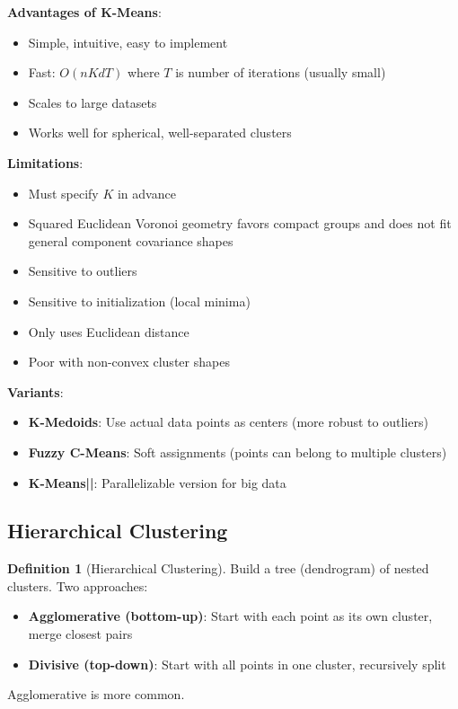 \documentclass[11pt,twoside]{article}
\numberwithin{equation}{section}
\theoremstyle{plain}
\theoremstyle{definition}
\newtheorem{definition}[theorem]{Definition}
\theoremstyle{remark}
\newenvironment{keyidea}{
  \begin{tcolorbox}[colback=yellow!5!white,
                    colframe=yellow!50!black,
                    title=Key Idea,
                    breakable,
                    enhanced,
                    sharp corners,
                    boxrule=0.8pt,
                    left=6pt, right=6pt, top=6pt, bottom=6pt]
}{
  \end{tcolorbox}
}
\begin{document}
\begin{keyidea}
\textbf{Advantages of K-Means}:
\begin{itemize}
\item Simple, intuitive, easy to implement
\item Fast: $O(nKdT)$ where $T$ is number of iterations (usually small)
\item Scales to large datasets
\item Works well for spherical, well-separated clusters
\end{itemize}

\textbf{Limitations}:
\begin{itemize}
\item Must specify $K$ in advance
\item Squared Euclidean Voronoi geometry favors compact groups and does not fit general component covariance shapes
\item Sensitive to outliers
\item Sensitive to initialization (local minima)
\item Only uses Euclidean distance
\item Poor with non-convex cluster shapes
\end{itemize}

\textbf{Variants}:
\begin{itemize}
\item \textbf{K-Medoids}: Use actual data points as centers (more robust to outliers)
\item \textbf{Fuzzy C-Means}: Soft assignments (points can belong to multiple clusters)
\item \textbf{K-Means||}: Parallelizable version for big data
\end{itemize}
\end{keyidea}

\subsection{Hierarchical Clustering}

\begin{definition}[Hierarchical Clustering]
Build a tree (dendrogram) of nested clusters. Two approaches:
\begin{itemize}
\item \textbf{Agglomerative (bottom-up)}: Start with each point as its own cluster, merge closest pairs
\item \textbf{Divisive (top-down)}: Start with all points in one cluster, recursively split
\end{itemize}
Agglomerative is more common.
\end{definition}
\end{document}
